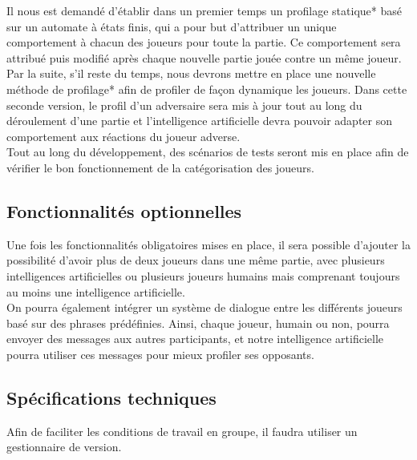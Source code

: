 \documentclass{report}
\begin{document}
Il nous est demandé d'établir dans un premier temps un profilage statique* basé sur un automate à états finis, qui a pour but d'attribuer un unique comportement à chacun des joueurs pour toute la partie. Ce comportement sera attribué puis modifié après chaque nouvelle partie jouée contre un même joueur.\\

Par la suite, s'il reste du temps, nous devrons mettre en place une nouvelle méthode de profilage* afin de profiler de façon dynamique les joueurs. Dans cette seconde version, le profil d'un adversaire sera mis à jour tout au long du déroulement d'une partie et l'intelligence artificielle devra pouvoir adapter son comportement aux réactions du joueur adverse.\\

Tout au long du développement, des scénarios de tests seront mis en place afin de vérifier le bon fonctionnement de la catégorisation des joueurs.\par

\subsection{Fonctionnalités optionnelles}

\hspace{0.5cm}Une fois les fonctionnalités obligatoires mises en place, il sera possible d'ajouter la possibilité d'avoir plus de deux joueurs dans une même partie, avec plusieurs intelligences artificielles ou plusieurs joueurs humains mais comprenant toujours au moins une intelligence artificielle.\\

On pourra également intégrer un système de dialogue entre les différents joueurs basé sur des phrases prédéfinies. Ainsi, chaque joueur, humain ou non, pourra envoyer des messages aux autres participants, et notre intelligence artificielle pourra utiliser ces messages pour mieux profiler ses opposants.\par 

\subsection{Spécifications techniques}

\hspace{0.5cm}Afin de faciliter les conditions de travail en groupe, il faudra utiliser un gestionnaire de version.\\
\end{document}

